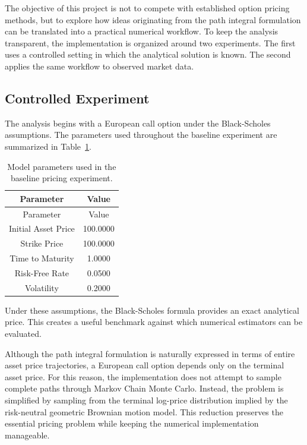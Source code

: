 \documentclass[
  12pt,
  letterpaper,
]{book}
\begin{document}
The objective of this project is not to compete with established option
pricing methods, but to explore how ideas originating from the path
integral formulation can be translated into a practical numerical
workflow. To keep the analysis transparent, the implementation is
organized around two experiments. The first uses a controlled setting in
which the analytical solution is known. The second applies the same
workflow to observed market data.

\subsection{Controlled Experiment}\label{controlled-experiment}

The analysis begins with a European call option under the Black-Scholes
assumptions. The parameters used throughout the baseline experiment are
summarized in Table~\ref{tbl-model-parameters}.

\begin{longtable}[]{@{}cc@{}}
\caption{Model parameters used in the baseline pricing
experiment.}\label{tbl-model-parameters}\tabularnewline
\toprule\noalign{}
Parameter & Value \\
\midrule\noalign{}
\endfirsthead
\toprule\noalign{}
Parameter & Value \\
\midrule\noalign{}
\endhead
\bottomrule\noalign{}
\endlastfoot
Initial Asset Price & 100.0000 \\
Strike Price & 100.0000 \\
Time to Maturity & 1.0000 \\
Risk-Free Rate & 0.0500 \\
Volatility & 0.2000 \\
\end{longtable}

Under these assumptions, the Black-Scholes formula provides an exact
analytical price. This creates a useful benchmark against which
numerical estimators can be evaluated.

Although the path integral formulation is naturally expressed in terms
of entire asset price trajectories, a European call option depends only
on the terminal asset price. For this reason, the implementation does
not attempt to sample complete paths through Markov Chain Monte Carlo.
Instead, the problem is simplified by sampling from the terminal
log-price distribution implied by the risk-neutral geometric Brownian
motion model. This reduction preserves the essential pricing problem
while keeping the numerical implementation manageable.
\end{document}
